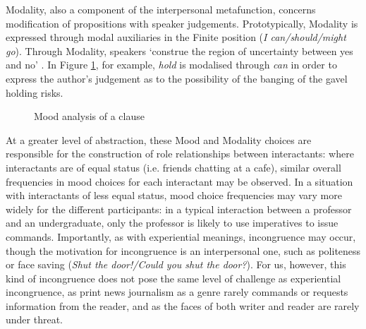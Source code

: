 Modality, also a component of the interpersonal metafunction, concerns modification of propositions with speaker judgements.
Prototypically, Modality is expressed through modal auxiliaries in the Finite position (\emph{I can/should/might go}). Through Modality, speakers `construe the region of uncertainty between yes and no' \cite[p.~147]{halliday_introduction_2004}. In Figure \ref{fig:moodannotation}, for example, \emph{hold} is modalised through \emph{can} in order to express the author's judgement as to the possibility of the banging of the gavel holding risks.

\begin{figure}[htb]
\centering \footnotesize \onehalfspacing
{}
\caption{Mood analysis of a clause}
\label{fig:moodannotation}
\end{figure}


At a greater level of abstraction, these Mood and Modality choices are responsible for the construction of role relationships between interactants: where interactants are of equal status (i.e. friends chatting at a cafe), similar overall frequencies in mood choices for each interactant may be observed. In a situation with interactants of less equal status, mood choice frequencies may vary more widely for the different participants: in a typical interaction between a professor and an undergraduate, only the professor is likely to use imperatives to issue commands. Importantly, as with experiential meanings, incongruence may occur, though the motivation for incongruence is an interpersonal one, such as politeness or face saving (\emph{Shut the door!/Could you shut the door?}). For us, however, this kind of incongruence does not pose the same level of challenge as experiential incongruence, as print news journalism as a genre rarely commands or requests information from the reader, and as the faces of both writer and reader are rarely under threat.

